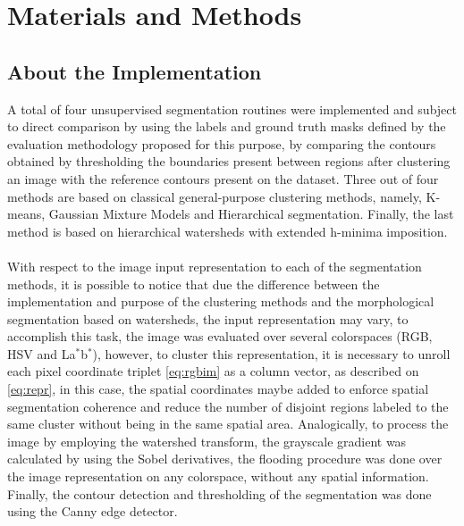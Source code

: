 \documentclass[10pt,twocolumn,letterpaper]{article}
\begin{document}
\section{Materials and Methods}


\subsection*{About the Implementation}
A total of four unsupervised segmentation routines were implemented and subject to direct comparison by using the labels and ground truth masks defined by the evaluation methodology proposed for this purpose, by comparing the contours obtained by thresholding the boundaries present between regions after clustering an image with the reference contours present on the dataset. Three out of four methods are based on classical general-purpose clustering methods, namely, K-means, Gaussian Mixture Models and Hierarchical segmentation. Finally, the last method is based on hierarchical watersheds with extended h-minima imposition. 
\\
\\
With respect to the image input representation to each of the segmentation methods, it is possible to notice that due the difference between the implementation and purpose of the clustering methods and the morphological segmentation based on watersheds, the input representation may vary, to accomplish this task, the image was evaluated over several colorspaces (RGB, HSV and La$^{*}$b$^{*}$), however, to cluster this representation, it is necessary to unroll each pixel coordinate triplet \eqref{eq:rgbim} as a column vector, as described on \eqref{eq:repr}, in this case, the spatial coordinates maybe added to enforce spatial segmentation coherence and reduce the number of disjoint regions labeled to the same cluster without being in the same spatial area. Analogically, to process the image by employing the watershed transform, the grayscale gradient was calculated by using the Sobel derivatives, the flooding procedure was done over the image representation on any colorspace, without any spatial information. Finally, the contour detection and thresholding of the segmentation was done using the Canny edge detector.
\end{document}
